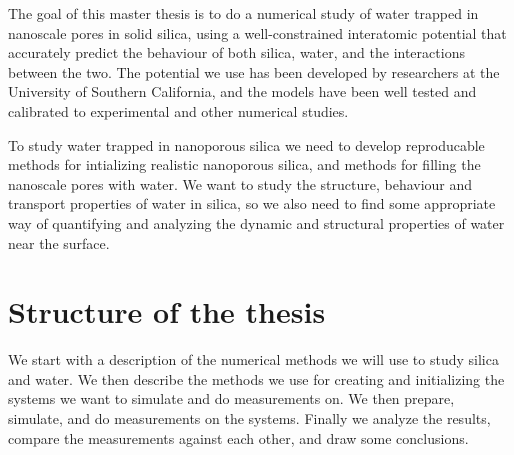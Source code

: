 The goal of this master thesis is to do a numerical study of water trapped in nanoscale pores in solid silica, using a well-constrained interatomic potential that accurately predict the behaviour of both silica, water, and the interactions between the two. The potential we use has been developed by researchers at the University of Southern California, and the models have been well tested and calibrated to experimental and other numerical studies.

To study water trapped in nanoporous silica we need to develop reproducable methods for intializing realistic nanoporous silica, and methods for filling the nanoscale pores with water. We want to study the structure, behaviour and transport properties of water in silica, so we also need to find some appropriate way of quantifying and analyzing the dynamic and structural properties of water near the surface.

% 

 



\section*{Structure of the thesis}
%
We start with a description of the numerical methods we will use to study silica and water. We then describe the methods we use for creating and initializing the systems we want to simulate and do measurements on. We then prepare, simulate, and do measurements on the systems. Finally we analyze the results, compare the measurements against each other, and draw some conclusions.

% 



